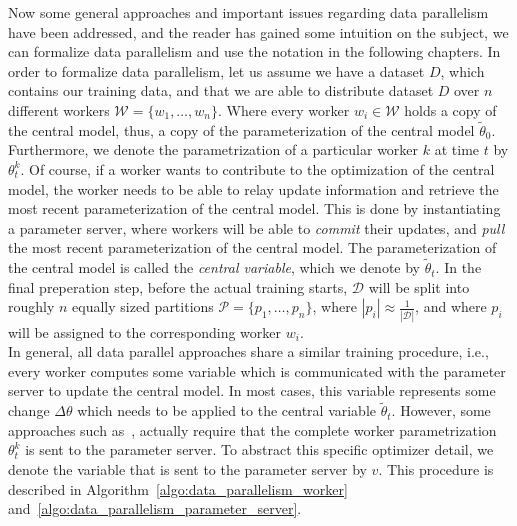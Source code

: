 \newpage

Now some general approaches and important issues regarding data parallelism have been addressed, and the reader has gained some intuition on the subject, we can formalize data parallelism and use the notation in the following chapters. In order to formalize data parallelism, let us assume we have a dataset $D$, which contains our training data, and that we are able to distribute dataset $D$ over $n$ different workers $\mathcal{W} = \{w_1, \ldots, w_n\}$. Where every worker $w_i \in \mathcal{W}$ holds a copy of the central model, thus, a copy of the parameterization of the central model $\tilde{\theta}_0$. Furthermore, we denote the parametrization of a particular worker $k$ at time $t$ by $\theta_t^k$. Of course, if a worker wants to contribute to the optimization of the central model, the worker needs to be able to relay update information and retrieve the most recent parameterization of the central model. This is done by instantiating a parameter server, where workers will be able to \emph{commit} their updates, and \emph{pull} the most recent parameterization of the central model. The parameterization of the central model is called the \emph{central variable}, which we denote by $\tilde{\theta}_t$. In the final preperation step, before the actual training starts, $\mathcal{D}$ will be split into roughly $n$ equally sized partitions $\mathcal{P} = \{p_1, \ldots, p_n\}$, where $\left\vert{p_i}\right\vert \approx \frac{1}{\left\vert{\mathcal{D}}\right\vert}$, and where $p_i$ will be assigned to the corresponding worker $w_i$.\\

In general, all data parallel approaches share a similar training procedure, i.e., every worker computes some variable which is communicated with the parameter server to update the central model. In most cases, this variable represents some change $\Delta\theta$ which needs to be applied to the central variable $\tilde{\theta}_t$. However, some approaches such as~\cite{zhang2015deep}, actually require that the complete worker parametrization $\theta^k_t$ is sent to the parameter server. To abstract this specific optimizer detail, we denote the variable that is sent to the parameter server by $v$. This procedure is described in Algorithm~\ref{algo:data_parallelism_worker} and~\ref{algo:data_parallelism_parameter_server}.

